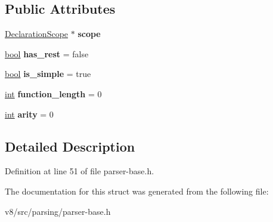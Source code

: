 \subsection*{Public Attributes}
\begin{DoxyCompactItemize}
\item 
\mbox{\label{structv8_1_1internal_1_1FormalParametersBase_a94d64d2461228e8eb54ba4d9ae1c9f3a}} 
\mbox{\hyperlink{classv8_1_1internal_1_1DeclarationScope}{Declaration\+Scope}} $\ast$ {\bfseries scope}
\item 
\mbox{\label{structv8_1_1internal_1_1FormalParametersBase_ad07160002fd880fa04a61da8d177742f}} 
\mbox{\hyperlink{classbool}{bool}} {\bfseries has\+\_\+rest} = false
\item 
\mbox{\label{structv8_1_1internal_1_1FormalParametersBase_a6452dec4905dce7bbd0c0bf454e93129}} 
\mbox{\hyperlink{classbool}{bool}} {\bfseries is\+\_\+simple} = true
\item 
\mbox{\label{structv8_1_1internal_1_1FormalParametersBase_a42e9ae4ec010fdc237cbc6deaf172916}} 
\mbox{\hyperlink{classint}{int}} {\bfseries function\+\_\+length} = 0
\item 
\mbox{\label{structv8_1_1internal_1_1FormalParametersBase_a8636cc40e165975979c6e9151c421574}} 
\mbox{\hyperlink{classint}{int}} {\bfseries arity} = 0
\end{DoxyCompactItemize}


\subsection{Detailed Description}


Definition at line 51 of file parser-\/base.\+h.



The documentation for this struct was generated from the following file\+:\begin{DoxyCompactItemize}
\item 
v8/src/parsing/parser-\/base.\+h\end{DoxyCompactItemize}
